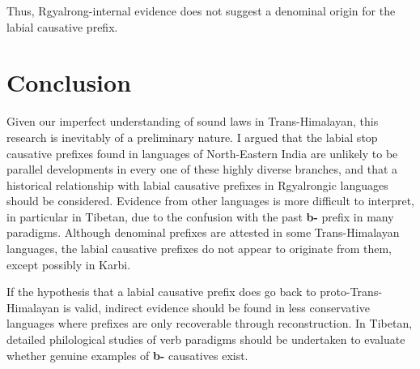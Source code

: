 \documentclass[oneside,a4paper,11pt]{article}
\newcommand{\ipa}[1]{\textbf{{\phon\mbox{#1}}}} %
\begin{document}
Thus, Rgyalrong-internal evidence does not suggest a denominal origin for the labial causative  prefix.

 \section{Conclusion}
Given our imperfect understanding of sound laws in Trans-Himalayan, this research is inevitably of a preliminary nature. I argued that the labial stop causative prefixes found in languages of North-Eastern India are unlikely to be parallel developments in every one of these highly diverse branches, and that a historical relationship with labial causative prefixes in Rgyalrongic languages should be considered. Evidence from other languages is more difficult to interpret, in particular in Tibetan, due to the confusion with the past \ipa{b-} prefix in many paradigms. Although denominal prefixes are attested in some Trans-Himalayan languages, the labial causative prefixes do not appear to originate from  them, except possibly in Karbi.

If the hypothesis that a labial causative prefix does go back to proto-Trans-Himalayan is valid, indirect evidence should be found in less conservative languages where prefixes are only recoverable through reconstruction. In Tibetan, detailed philological studies of verb paradigms should be undertaken to evaluate whether genuine examples of \ipa{b-} causatives exist. 
 
 \phon


\end{document}
